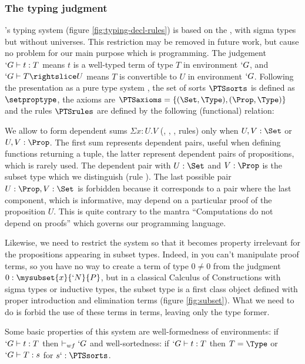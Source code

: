 \documentclass[twocolumn]{article}
\begin{document}
\subsubsection{The typing judgment}
\Russell{}'s typing system (figure \vref{fig:typing-decl-rules}) is based
on the \CCfull \cite{Barras}, with sigma types but without universes.
This restriction may be removed in future work, but cause no problem for
our main purpose which is programming. The judgement $`G \vdash t : T$
means $t$ is a well-typed term of type $T$ in environment $`G$, and $`G
\typed T \subd U$ means $T$ is convertible to $U$ in environment $`G$.
Following the presentation as a pure type system \cite{PTS}, 
the set of sorts $\PTSsorts$ is defined as $\setproptype$, the
axioms are $\PTSaxioms = \{ (\Set, \Type), (\Prop, \Type) \}$ and the
rules $\PTSrules$ are defined by the following (functional) relation:
\axiomsd

We allow to form dependent sums $\Sigma x : U.V$ (, ,
,  rules) only when $U, V : \Set$
or $U, V : \Prop$. The first sum represents dependent pairs, useful
when defining functions returning a tuple, the latter represent
dependent pairs of propositions, which is rarely used. The dependent
pair with $U : \Set$ and $V : \Prop$ is the subset type which we
distinguish (rule ). The last possible pair $U : \Prop, V : \Set$ is forbidden
because it corresponds to a pair where the last component, which is
informative, may depend on a particular proof of the proposition
$U$. This is quite contrary to the mantra ``Computations do not depend
on proofs'' which governs our programming language.

Likewise, we need to restrict the system so that it becomes property irrelevant for
the propositions appearing in subset types. Indeed, in \PVS{} you can't
manipulate proof terms, so you have
no way to create a term of type $0 \neq 0$ from the judgment $0 :
\mysubset{x}{`N}{P}$, but in a classical Calculus of Constructions with
sigma types or inductive types, the subset type is a first class object
defined with proper introduction and
elimination terms (figure \vref{fig:subset}). What we need to do is forbid the use of these terms
in \Russell{} terms, leaving only the type former.

Some basic properties of this system are well-formedness of
environments: if $`G \vdash t : T$ then $\vdash_{wf} `G$ and
well-sortedness: if $`G \vdash t : T$ then $T = \Type$ or $`G \vdash T :
s$ for $s `: \PTSsorts$.
\end{document}
